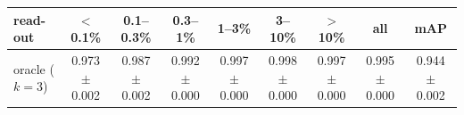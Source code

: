 \begin{tabular}{lcccccccc}
\toprule
read-out & $<$0.1\% & 0.1--0.3\% & 0.3--1\% & 1--3\% & 3--10\% & $>$10\% & all & mAP \\
\midrule
oracle ($k=3$) & 0.973 $\pm$ 0.002 & 0.987 $\pm$ 0.002 & 0.992 $\pm$ 0.000 & 0.997 $\pm$ 0.000 & 0.998 $\pm$ 0.000 & 0.997 $\pm$ 0.000 & 0.995 $\pm$ 0.000 & 0.944 $\pm$ 0.002 \\
\bottomrule
\end{tabular}
